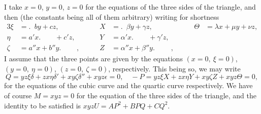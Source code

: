 \documentclass[11pt,a4paper]{article}
\begin{document}
I take $x=0$, $y=0$, $z=0$ for the equations of the three sides of the triangle, and
then (the constants being all of them arbitrary) writing for shortness
\begin{alignat*}{3}
\xi &= .\phantom{''}by+cz, \qquad & X &= .\phantom{''}\beta y+\gamma z, \qquad & \Theta &= \lambda x+\mu y+\nu z,\\
\eta &= a'x.\phantom{+c'z} + c'z, \qquad & Y &= \alpha'x.\phantom{+\gamma'z} + \gamma'z, \qquad & \\[-0.5ex]
\zeta &= a''x+b''y.\phantom{+c''z}, \qquad & Z &= \alpha''x+\beta''y.\phantom{+\gamma''z}, \qquad &
\end{alignat*}
I assume that the three points are given by the equations $(x=0,\ \xi=0)$, $(y=0,\ \eta=0)$,
$(z=0,\ \zeta=0)$, respectively. This being so, we may write
\[
Q = yz\xi\delta + zx\eta\delta' + xy\zeta\delta'' + xyz\epsilon = 0, \quad
-P = yz\xi X + zx\eta Y + xy\zeta Z + xyz\Theta = 0,
\]
for the equations of the cubic curve and the quartic curve respectively. We have
of course $M=xyz=0$ for the equation of the three sides of the triangle, and the
identity to be satisfied is $xyzU = AP^2 + BPQ + CQ^2$.
\end{document}
